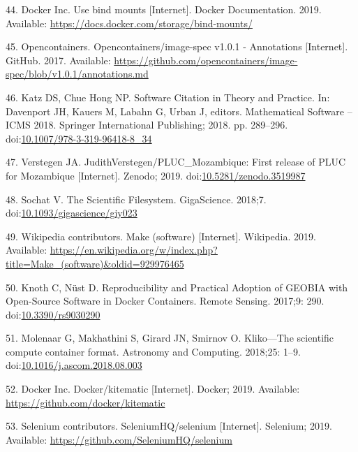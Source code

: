 \documentclass[10pt,letterpaper]{article}
\begin{document}
\leavevmode\hypertarget{ref-docker_use_2019}{}%
44. Docker Inc. Use bind mounts {[}Internet{]}. Docker Documentation.
2019. Available: \url{https://docs.docker.com/storage/bind-mounts/}

\leavevmode\hypertarget{ref-opencontainers_image-spec_2017}{}%
45. Opencontainers. Opencontainers/image-spec v1.0.1 - Annotations
{[}Internet{]}. GitHub. 2017. Available:
\url{https://github.com/opencontainers/image-spec/blob/v1.0.1/annotations.md}

\leavevmode\hypertarget{ref-katz_software_2018}{}%
46. Katz DS, Chue Hong NP. Software Citation in Theory and Practice. In:
Davenport JH, Kauers M, Labahn G, Urban J, editors. Mathematical
Software -- ICMS 2018. Springer International Publishing; 2018. pp.
289--296.
doi:\href{https://doi.org/10.1007/978-3-319-96418-8_34}{10.1007/978-3-319-96418-8\_34}

\leavevmode\hypertarget{ref-verstegen_pluc_mozambique_2019}{}%
47. Verstegen JA. JudithVerstegen/PLUC\_Mozambique: First release of
PLUC for Mozambique {[}Internet{]}. Zenodo; 2019.
doi:\href{https://doi.org/10.5281/zenodo.3519987}{10.5281/zenodo.3519987}

\leavevmode\hypertarget{ref-sochat_scientific_2018}{}%
48. Sochat V. The Scientific Filesystem. GigaScience. 2018;7.
doi:\href{https://doi.org/10.1093/gigascience/giy023}{10.1093/gigascience/giy023}

\leavevmode\hypertarget{ref-wikipedia_contributors_make_2019}{}%
49. Wikipedia contributors. Make (software) {[}Internet{]}. Wikipedia.
2019. Available:
\url{https://en.wikipedia.org/w/index.php?title=Make_(software)\&oldid=929976465}

\leavevmode\hypertarget{ref-knoth_reproducibility_2017}{}%
50. Knoth C, Nüst D. Reproducibility and Practical Adoption of GEOBIA
with Open-Source Software in Docker Containers. Remote Sensing. 2017;9:
290. doi:\href{https://doi.org/10.3390/rs9030290}{10.3390/rs9030290}

\leavevmode\hypertarget{ref-molenaar_klikoscientific_2018}{}%
51. Molenaar G, Makhathini S, Girard JN, Smirnov O. Kliko---The
scientific compute container format. Astronomy and Computing. 2018;25:
1--9.
doi:\href{https://doi.org/10.1016/j.ascom.2018.08.003}{10.1016/j.ascom.2018.08.003}

\leavevmode\hypertarget{ref-docker_kitematic_2019}{}%
52. Docker Inc. Docker/kitematic {[}Internet{]}. Docker; 2019.
Available: \url{https://github.com/docker/kitematic}

\leavevmode\hypertarget{ref-selenium_2019}{}%
53. Selenium contributors. SeleniumHQ/selenium {[}Internet{]}. Selenium;
2019. Available: \url{https://github.com/SeleniumHQ/selenium}
\end{document}
